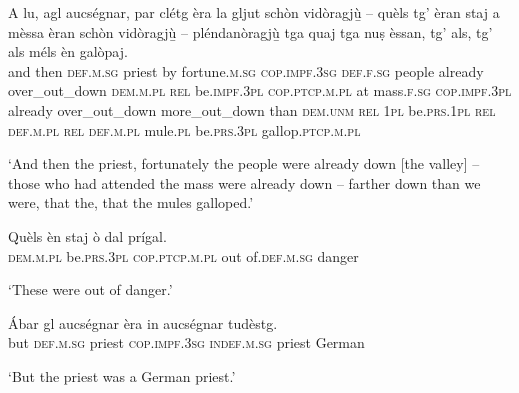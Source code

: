\begin{linenumbers}
\gll   A lu, agl aucségnar, par clétg èra la gljut schòn vidòragjù̱ – quèls tg’ èran staj a mèssa èran schòn vidòragjù̱ – pléndanòragjù̱ tga quaj tga nuṣ èssan, tg’ als, tg’ als méls èn galòpaj.  \\
and then \textsc{def.m.sg} priest by fortune.\textsc{m.sg} \textsc{cop.impf.3sg} \textsc{def.f.sg} people already over\_out\_down {} \textsc{dem.m.pl} \textsc{rel} be.\textsc{impf.3pl} \textsc{cop.ptcp.m.pl} at mass.\textsc{f.sg} \textsc{cop.impf.3pl} already over\_out\_down {} more\_out\_down than \textsc{dem.unm} \textsc{rel} \textsc{1pl} be.\textsc{prs.1pl} \textsc{rel} \textsc{def.m.pl} \textsc{rel} \textsc{def.m.pl} mule.\textsc{pl} be.\textsc{prs.3pl} gallop.\textsc{ptcp.m.pl}\\
\end{linenumbers}
\medskip
\glt `And then the priest, fortunately the people were already down [the valley] – those who had attended the mass were already down – farther down than we were, that the, that the mules galloped.'
\medskip

\begin{linenumbers}
\gll   Quèls èn staj ò dal prígal. \\
 \textsc{dem.m.pl} be.\textsc{prs.3pl} \textsc{cop.ptcp.m.pl} out of.\textsc{def.m.sg} danger\\
\end{linenumbers}
\medskip
\glt `These were out of danger.'
\medskip

\begin{linenumbers}
\gll   Ábar gl aucségnar èra in aucségnar tudèstg.\\
but \textsc{def.m.sg} priest \textsc{cop.impf.3sg} \textsc{indef.m.sg} priest German \\
\end{linenumbers}
\medskip
\glt `But the priest was a German priest.'
\medskip

